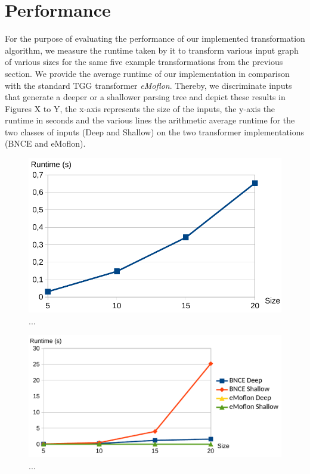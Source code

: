 \section{Performance}
For the purpose of evaluating the performance of our implemented transformation algorithm, we measure the runtime taken by it to transform various input graph of various sizes for the same five example transformations from the previous section. We provide the average runtime of our implementation in comparison with the standard TGG transformer \emph{eMoflon}. Thereby, we discriminate inputs that generate a deeper or a shallower parsing tree and depict these results in Figures X to Y, the x-axis represents the size of the inputs, the y-axis the runtime in seconds and the various lines the arithmetic average runtime for the two classes of inputs (Deep and Shallow) on the two transformer implementations (BNCE and eMoflon).


\begin{figure}
	\centering
	\includegraphics[width=.5\textwidth]{figures/performance/star2wheel}
	\caption{...}
	\label{fig:performance-star2wheel}
\end{figure}

\begin{figure}
	\centering
	\includegraphics{figures/performance/pseudocode2controlflow}
	\caption{...}
	\label{fig:performance-pseudocode2controlflow}
\end{figure}

